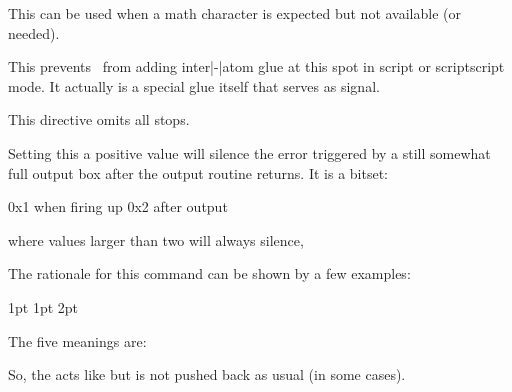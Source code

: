 \stopoldprimitive

\startnewprimitive[title={\prm {nomathchar}}]

This can be used when a math character is expected but not available (or needed).

\stopnewprimitive

\startoldprimitive[title={\prm {nonscript}}]

This prevents \TEX\ from adding inter|-|atom glue at this spot in script or
scriptscript mode. It actually is a special glue itself that serves as signal.

\stopoldprimitive

\startoldprimitive[title={\prm {nonstopmode}}]

This directive omits all stops.

\stopoldprimitive

\startnewprimitive[title={\prm {nooutputboxerror}}]

Setting this a positive value will silence the error triggered by a still
somewhat full output box after the output routine returns. It is a bitset:

\starttabulate[|T||]
\NC 0x1 \NC when firing up \NC \NR
\NC 0x2 \NC after output   \NC \NR
\stoptabulate

where values larger than two will always silence,

\stopnewprimitive

\startnewprimitive[title={\prm {norelax}}]

The rationale for this command can be shown by a few examples:

\startbuffer
{} 1pt  1pt  2pt
\edef\testa{\ifdim\dimen0=\dimen2\norelax N\else Y\fi}
\edef\testb{\ifdim\dimen0=\dimen2\relax   N\else Y\fi}
\edef\testc{\ifdim\dimen0=\dimen4\norelax N\else Y\fi}
\edef\testd{\ifdim\dimen0=\dimen4\relax   N\else Y\fi}
\edef\teste{\norelax}
\stopbuffer

\typebuffer

The five meanings are:

\start \getbuffer \starttabulate[|T|T|]
\NC \string\testa \NC \meaning\testa \NC \NR
\NC \string\testb \NC \meaning\testb \NC \NR
\NC \string\testc \NC \meaning\testc \NC \NR
\NC \string\testd \NC \meaning\testd \NC \NR
\NC \string\teste \NC \meaning\teste \NC \NR
\stoptabulate \stop

So, the  acts like  but is not pushed back as
usual (in some cases).

\stopnewprimitive

